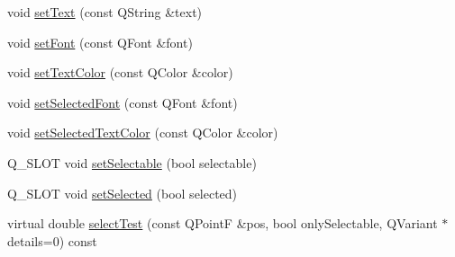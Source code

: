 \begin{DoxyCompactItemize}
\item 
void \hyperlink{classQCPPlotTitle_aae5a93e88050dfb2cbf6adc087516821}{set\+Text} (const Q\+String \&text)
\item 
void \hyperlink{classQCPPlotTitle_a199fc7170802ea65006c371875349e37}{set\+Font} (const Q\+Font \&font)
\item 
void \hyperlink{classQCPPlotTitle_a71273e3a0ca6b4c151591b37b9e5ce33}{set\+Text\+Color} (const Q\+Color \&color)
\item 
void \hyperlink{classQCPPlotTitle_a5245980ead999ceed51dbe702d0e3131}{set\+Selected\+Font} (const Q\+Font \&font)
\item 
void \hyperlink{classQCPPlotTitle_a09ffd8c52ac8824d00382f84be391b66}{set\+Selected\+Text\+Color} (const Q\+Color \&color)
\item 
Q\+\_\+\+S\+L\+O\+T void \hyperlink{classQCPPlotTitle_a8866b07b9fa14877d4cefbf38406c5dd}{set\+Selectable} (bool selectable)
\item 
Q\+\_\+\+S\+L\+O\+T void \hyperlink{classQCPPlotTitle_a8d441a889d371307df86f1ab7687a333}{set\+Selected} (bool selected)
\item 
virtual double \hyperlink{classQCPPlotTitle_a5b7ae716be9134a48f4e378feb0e6699}{select\+Test} (const Q\+Point\+F \&pos, bool only\+Selectable, Q\+Variant $\ast$details=0) const 
\end{DoxyCompactItemize}
